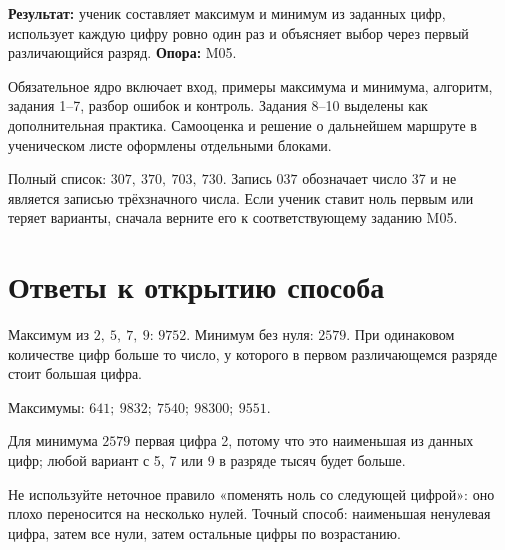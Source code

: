 
\begin{teacherbox}
  \textbf{Результат:} ученик составляет максимум и минимум из заданных цифр,
  использует каждую цифру ровно один раз и объясняет выбор через первый
  различающийся разряд. \textbf{Опора:} M05.
\end{teacherbox}

\begin{teacherbox}
  Обязательное ядро включает вход, примеры максимума и минимума, алгоритм,
  задания 1--7, разбор ошибок и контроль. Задания 8--10 выделены как
  дополнительная практика. Самооценка и решение о дальнейшем маршруте в
  ученическом листе оформлены отдельными блоками.
\end{teacherbox}

\begin{checkpointbox}[Вход]
  Полный список: \(307,\ 370,\ 703,\ 730\). Запись \(037\) обозначает число
  37 и не является записью трёхзначного числа. Если ученик ставит ноль первым
  или теряет варианты, сначала верните его к соответствующему заданию M05.
\end{checkpointbox}

\section{Ответы к открытию способа}

Максимум из \(2,\ 5,\ 7,\ 9\): \(9752\). Минимум без нуля: \(2579\).
При одинаковом количестве цифр больше то число, у которого в первом
различающемся разряде стоит большая цифра.

\begin{teacherbox}[Задания 1 и 2]
  Максимумы: \(641;\ 9832;\ 7540;\ 98300;\ 9551\).

  Для минимума \(2579\) первая цифра 2, потому что это наименьшая из данных
  цифр; любой вариант с 5, 7 или 9 в разряде тысяч будет больше.
\end{teacherbox}

\begin{teacherbox}
  Не используйте неточное правило «поменять ноль со следующей цифрой»: оно
  плохо переносится на несколько нулей. Точный способ: наименьшая ненулевая
  цифра, затем все нули, затем остальные цифры по возрастанию.
\end{teacherbox}

